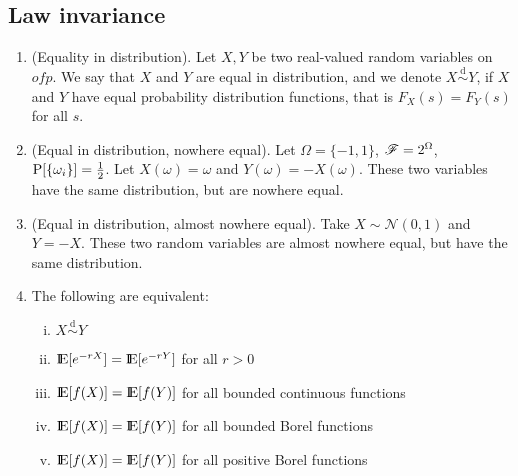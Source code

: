 \documentclass[a4paper,10pt]{article}
\begin{document}
\subsection{Law invariance}
\begin{enumerate}
 \item (Equality in distribution). 
      Let $X,Y$ be two real-valued random variables on $ofp$.
      We say that $X$ and $Y$ are equal in distribution, and we denote $X\overset{\mathrm{d}}{\sim} Y$,
      if $X$ and $Y$ have equal probability distribution functions, that is $F_X(s) = F_Y(s)$ for all $s$.

 \item (Equal in distribution, nowhere equal). Let $\Omega = \{-1,1\}$, $\mathscr{F}=2^\Omega$, $\mathrm{P}[\{\omega_i\}]=\frac{1}{2}$.
       Let $X(\omega) = \omega$ and $Y(\omega) = -X(\omega)$. These two variables have the same distribution, but 
       are nowhere equal.
 
 \item (Equal in distribution, almost nowhere equal). Take $X\sim \mathcal{N}(0,1)$ and $Y=-X$. These 
       two random variables are almost nowhere equal, but have the same distribution.
       
 \item The following are equivalent:
      \begin{enumerate}[(i)]
       \item $X\overset{\mathrm{d}}{\sim} Y$
       \item $\E[e^{-rX}]=\E[e^{-rY}]$ for all $r>0$
       \item $\E[f(X)] = \E[f(Y)]$ for all bounded continuous functions
       \item $\E[f(X)] = \E[f(Y)]$ for all bounded Borel functions
       \item $\E[f(X)] = \E[f(Y)]$ for all positive Borel functions	
      \end{enumerate}

 
 
\end{enumerate}
\end{document}
